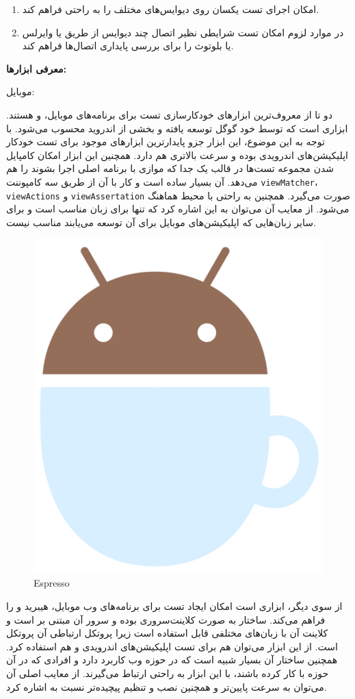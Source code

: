 {\begin{enumerate}
	\item 
	امکان اجرای تست یکسان روی دیوایس‌های مختلف را به راحتی فراهم کند.
	
	\item
	در موارد لزوم امکان تست شرایطی نظیر اتصال چند دیوایس از طریق  یا وایرلس یا بلوتوث را برای بررسی پایداری اتصال‌ها فراهم کند.
\end{enumerate}



\textbf{معرفی ابزارها:}

موبایل:



دو تا از معروف‌ترین ابزار‌های خودکارسازی تست برای برنامه‌های موبایل،  و  هستند.  ابزاری است که توسط خود گوگل توسعه یافته و بخشی از  اندروید محسوب می‌شود. با توجه به این موضوع، این ابزار جزو پایدارترین ابزارهای موجود برای تست خودکار اپلیکیشن‌های اندرویدی بوده و سرعت بالاتری هم دارد. همچنین این ابزار امکان کامپایل شدن مجموعه تست‌ها در قالب یک  جدا که موازی با برنامه اصلی اجرا بشوند را هم می‌دهد.  آن بسیار ساده است و کار با آن از طریق سه کامپوننت 
\texttt{viewMatcher}، \texttt{viewActions} 
و 
\texttt{viewAssertation}
 صورت می‌گیرد. همچنین به راحتی با محیط  هماهنگ می‌شود. از معایب آن می‌توان به این اشاره کرد که تنها برای زبان  مناسب است و برای سایر زبان‌هایی که اپلیکیشن‌های موبایل برای آن توسعه می‌یابند مناسب نیست. 
 
 \begin{figure}[H]
 	\centering
 	\includegraphics[width=0.3\linewidth]{figs/espresso.png}
 	\caption{Espresso}
 	\label{fig:espresso}
 \end{figure}


از سوی دیگر،  ابزاری است امکان ایجاد تست برای برنامه‌های وب موبایل، هیبرید و  را فراهم می‌کند. ساختار  به صورت کلاینت‌سروری بوده و سرور آن مبتنی بر 
است و کلاینت‌ آن با زبان‌های مختلفی قابل استفاده است زیرا پروتکل ارتباطی آن پروتکل
 است. از این ابزار می‌توان هم برای تست اپلیکیشن‌های اندرویدی و هم  استفاده کرد.  همچنین ساختار آن بسیار شبیه  است که در حوزه وب کاربرد دارد و افرادی که در آن حوزه با  کار کرده باشند، با این ابزار به راحتی ارتباط می‌گیرند. از معایب اصلی آن می‌توان به سرعت پایین‌تر و همچنین نصب و تنظیم پیچیده‌تر نسبت به  اشاره کرد.
 
}
